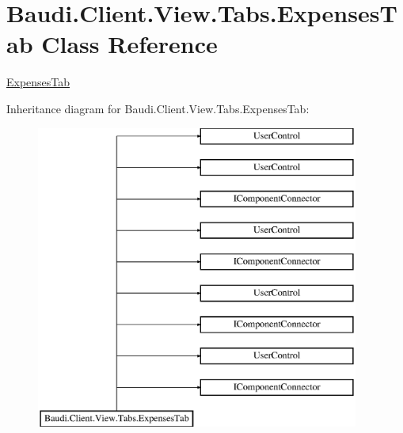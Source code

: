 \hypertarget{class_baudi_1_1_client_1_1_view_1_1_tabs_1_1_expenses_tab}{}\section{Baudi.\+Client.\+View.\+Tabs.\+Expenses\+Tab Class Reference}
\label{class_baudi_1_1_client_1_1_view_1_1_tabs_1_1_expenses_tab}


\hyperlink{class_baudi_1_1_client_1_1_view_1_1_tabs_1_1_expenses_tab}{Expenses\+Tab}  


Inheritance diagram for Baudi.\+Client.\+View.\+Tabs.\+Expenses\+Tab\+:\begin{figure}[H]
\begin{center}
\leavevmode
\includegraphics[height=10.000000cm]{class_baudi_1_1_client_1_1_view_1_1_tabs_1_1_expenses_tab}
\end{center}
\end{figure}
